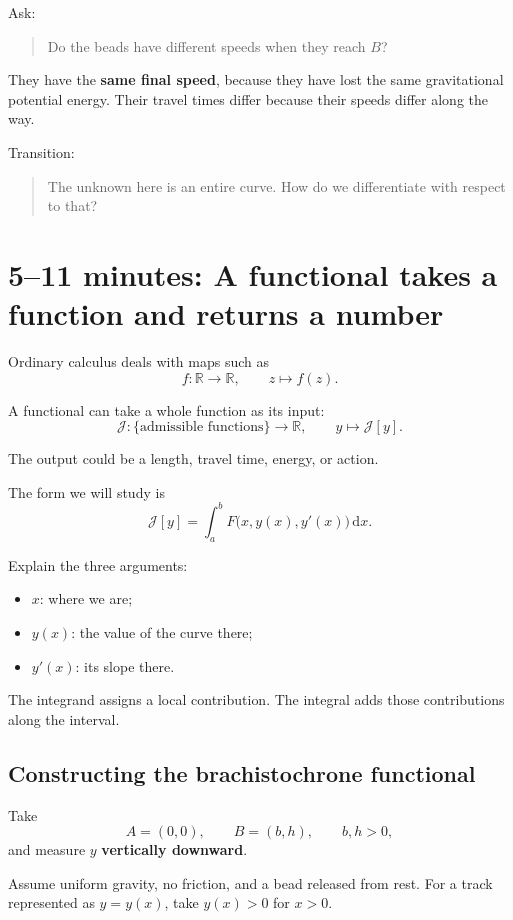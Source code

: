 \documentclass[11pt,a4paper]{article}
\newcommand{\dd}{\mathrm{d}}
\newcommand{\J}{\mathcal{J}}
\begin{document}
Ask:
\begin{quote}
Do the beads have different speeds when they reach \(B\)?
\end{quote}

They have the \textbf{same final speed}, because they have lost the
same gravitational potential energy. Their travel times differ
because their speeds differ along the way.

Transition:
\begin{quote}
The unknown here is an entire curve.
How do we differentiate with respect to that?
\end{quote}

\section*{5--11 minutes: A functional takes a function and returns a number}

Ordinary calculus deals with maps such as
\[
f:\mathbb{R}\longrightarrow\mathbb{R},
\qquad
z\longmapsto f(z).
\]

A functional can take a whole function as its input:
\[
\J:\{\text{admissible functions}\}\longrightarrow\mathbb{R},
\qquad
y\longmapsto\J[y].
\]

The output could be a length, travel time, energy, or action.

The form we will study is
\[
\boxed{
\J[y]
=
\int_a^b F\bigl(x,y(x),y'(x)\bigr)\,\dd x.
}
\]

Explain the three arguments:
\begin{itemize}
\item \(x\): where we are;
\item \(y(x)\): the value of the curve there;
\item \(y'(x)\): its slope there.
\end{itemize}

The integrand assigns a local contribution.
The integral adds those contributions along the interval.

\subsection*{Constructing the brachistochrone functional}

Take
\[
A=(0,0),
\qquad
B=(b,h),
\qquad
b,h>0,
\]
and measure \(y\) \textbf{vertically downward}.

Assume uniform gravity, no friction, and a bead released from rest.
For a track represented as \(y=y(x)\), take \(y(x)>0\) for \(x>0\).
\end{document}
